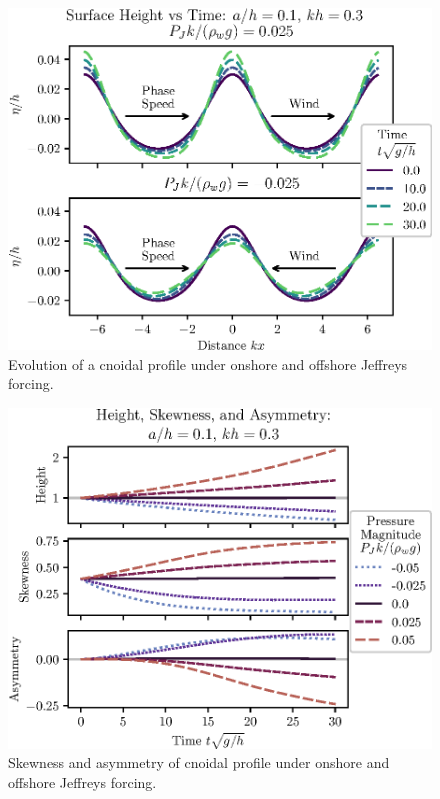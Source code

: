 \documentclass{jfm}
\begin{document}
\begin{figure}
  \centering
  \includegraphics{Snapshots-Positive-Negative-Cnoidal.eps}
  \caption{
    Evolution of a cnoidal profile under onshore and offshore Jeffreys
    forcing.
  }
\end{figure}

\begin{figure}
  \centering
  \includegraphics{Skew-Asymm-Cnoidal.eps}
  \caption{
    Skewness and asymmetry of cnoidal profile under onshore and offshore
    Jeffreys forcing.
  }
\end{figure}
\end{document}

